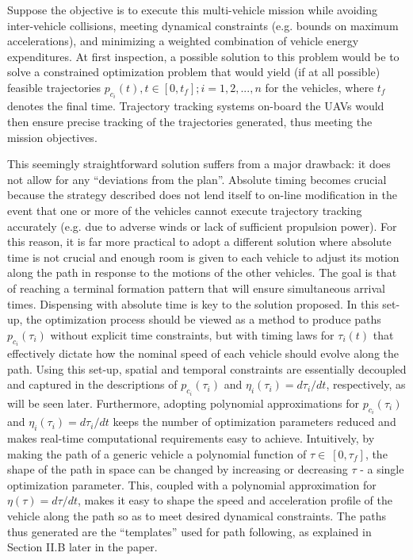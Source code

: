 \documentclass[]{aiaa-tc}%
\begin{document}
Suppose the objective is to execute this multi-vehicle mission
while avoiding inter-vehicle collisions, meeting dynamical
constraints (e.g. bounds on maximum accelerations), and minimizing
a weighted combination of vehicle energy expenditures. At first
inspection, a possible solution to this problem would be to solve
a constrained optimization problem that would yield (if at all
possible) feasible trajectories $p_{c_i}(t), t \in [0, t_f];
i=1,2,...,n$ for the vehicles, where $t_f$ denotes the final time.
Trajectory tracking systems on-board the UAVs would then ensure
precise tracking of the trajectories generated, thus meeting the
mission objectives.

This seemingly straightforward solution suffers from a major
drawback: it does not allow for any ``deviations from the plan''.
Absolute timing becomes crucial because the strategy described
does not lend itself to on-line modification in the event that one
or more of the vehicles cannot execute trajectory tracking
accurately (e.g. due to adverse winds or lack of sufficient
propulsion power). For this reason, it is far more practical to
adopt a different solution where absolute time is not crucial and
enough room is given to each vehicle to adjust its motion along
the path in response to the motions of the other vehicles. The
goal is that of reaching a terminal formation pattern that will
ensure simultaneous arrival times. Dispensing with absolute time
is key to the solution proposed. In this set-up, the optimization
process should be viewed as a method to produce paths
$p_{c_i}(\tau_i)$ without explicit time constraints, but with
timing laws for $\tau_i(t)$ that effectively dictate how the
nominal speed of each vehicle should evolve along the path. Using
this set-up, spatial and temporal constraints are essentially
decoupled and captured in the descriptions of $p_{c_i}(\tau_i)$
and $\eta_i(\tau_i)=d\tau_i/dt$, respectively, as will be seen
later. Furthermore, adopting polynomial approximations for
$p_{c_i}(\tau_i)$ and $\eta_i(\tau_i)=d\tau_i/dt$ keeps the number
of optimization parameters reduced and makes real-time
computational requirements easy to achieve. Intuitively, by making
the path of a generic vehicle a polynomial function of  $\tau \in
\ [0, \tau_f ]$, the shape of the path in space can be changed by
increasing or decreasing $\tau$ - a single optimization parameter.
This, coupled with a polynomial approximation for
$\eta(\tau)=d\tau/dt$, makes it easy to shape the speed and
acceleration profile of the vehicle along the path so as to meet
desired dynamical constraints. The paths thus generated are the
``templates'' used for path following, as explained in Section
II.B later in the paper.
\end{document}
